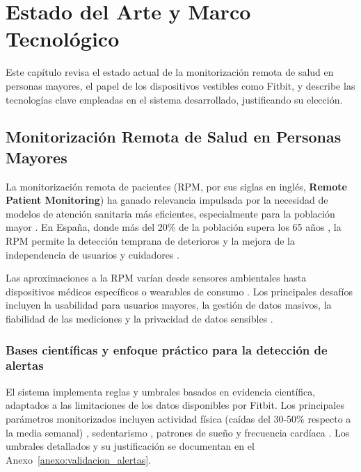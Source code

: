 \chapter{Estado del Arte y Marco Tecnológico}
\label{chap:estado_arte}

Este capítulo revisa el estado actual de la monitorización remota de salud en personas mayores, el papel de los dispositivos vestibles como Fitbit\textsuperscript{\textregistered}, y describe las tecnologías clave empleadas en el sistema desarrollado, justificando su elección.

\section{Monitorización Remota de Salud en Personas Mayores}
\label{sec:ea_monitorizacion_remota}

La monitorización remota de pacientes (RPM, por sus siglas en inglés, \textbf{Remote Patient Monitoring}) ha ganado relevancia impulsada por la necesidad de modelos de atención sanitaria más eficientes, especialmente para la población mayor \cite{noah2022mobile}. En España, donde más del 20\% de la población supera los 65 años \cite{ine_proyeccion_2022_2072}, la RPM permite la detección temprana de deterioros y la mejora de la independencia de usuarios y cuidadores \cite{bashshur2018telemedicine}.

Las aproximaciones a la RPM varían desde sensores ambientales hasta dispositivos médicos específicos o wearables de consumo \cite{majumder2017wearable}. Los principales desafíos incluyen la usabilidad para usuarios mayores, la gestión de datos masivos, la fiabilidad de las mediciones y la privacidad de datos sensibles \cite{lee2021challenges}.

\subsection{Bases científicas y enfoque práctico para la detección de alertas}
\label{subsec:bases_alertas}

El sistema implementa reglas y umbrales basados en evidencia científica, adaptados a las limitaciones de los datos disponibles por Fitbit. Los principales parámetros monitorizados incluyen actividad física (caídas del 30-50\% respecto a la media semanal) \cite{rebelo_physical_inactivity_consequences_2020, who_guidelines_2020}, sedentarismo \cite{bellettiere_pa_sedentary_aging_women_2017}, patrones de sueño \cite{nsf_older_adult_sleep_2022} y frecuencia cardíaca \cite{kang_hrv_thresholds_mortality_2021}. Los umbrales detallados y su justificación se documentan en el Anexo~\ref{anexo:validacion_alertas}.

